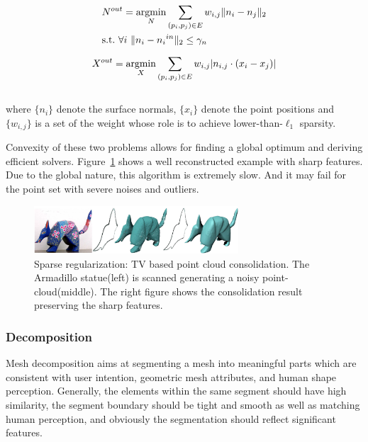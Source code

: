 \small{
\begin{equation}
 \label{eq:TVconsolidation1}
 \begin{aligned}
 &N^{out} =\mathop{\operatorname*{argmin}}_{N} \sum_{(p_{i},p_{j})\in E}^{} w_{i,j}\|n_{i}-n_{j}\|_2\\
 &\mathrm{s.t.}~\forall i~\|n_{i}-{n_{i}}^{in}\|_2\le \gamma_{n}
 \end{aligned}
\end{equation}
}
\small{
\begin{equation}
 \label{eq:TVconsolidation2}
 X^{out} = \mathop{\operatorname*{argmin}}_{X} \sum_{(p_{i},p_{j})\in E}^{} w_{i,j}|n_{i,j}\cdot (x_{i}-x_{j})|
\end{equation}
}
\\
where $\{n_{i}\}$ denote the surface normals, $\{x_{i}\}$ denote the point positions and $\{w_{i,j}\}$ is a set of the weight whose role is to achieve lower-than-$\ell_1$ sparsity.

Convexity of these two problems allows for finding a global optimum and deriving efficient solvers.
Figure~\ref{fig:TV consolidation} shows a well reconstructed example with sharp features.
Due to the global nature, this algorithm is extremely slow.
And it may fail for the point set with severe noises and outliers.

\begin{figure}[ht]
  \centering
  \includegraphics[width=3in]{images/TV_consolidation}
  \caption{Sparse regularization: TV based point cloud consolidation\cite{lipman2007parameterization}. The Armadillo statue(left) is scanned generating a noisy point-cloud(middle). The right figure shows the consolidation result preserving the sharp features.}
  \label{fig:TV consolidation}
\end{figure}


\subsubsection{Decomposition}
\label{subsubsection:Decompsition}

Mesh decomposition aims at segmenting a mesh into meaningful parts which are consistent with user intention, geometric mesh attributes, and human shape perception.
Generally, the elements within the same segment should have high similarity, the segment boundary should be tight and smooth as well as matching human perception, and obviously the segmentation should reflect significant features.

